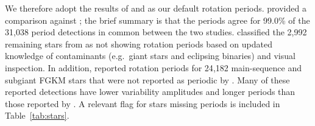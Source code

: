 \documentclass[11pt,twocolumn,tighten]{aastex63}
\begin{document}

We therefore adopt the results of  and
 as our default rotation periods.
 provided a comparison against
; the brief summary is that the periods
agree for 99.0\% of the 31{,}038 period detections in common between
the two studies.   classified the 2{,}992
remaining stars from  as not showing
rotation periods based on updated knowledge of contaminants
(e.g.~giant stars and eclipsing binaries) and visual inspection.  In
addition,  reported rotation periods for
24{,}182 main-sequence and subgiant FGKM stars that were not reported
as periodic by .  Many of these reported
detections have lower variability amplitudes and longer periods than
those reported by .  A relevant flag for
stars missing  periods is included in
Table~\ref{tab:stars}.
\end{document}
